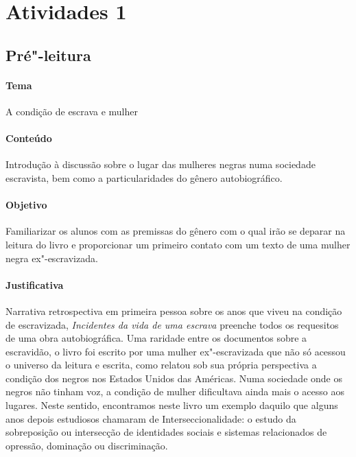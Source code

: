 \documentclass[11pt]{extarticle}
\begin{document}
\tableofcontents


\section{Atividades 1}


\subsection{Pré"-leitura}

\paragraph{Tema} A condição de escrava e mulher

\paragraph{Conteúdo} Introdução à discussão sobre o lugar das mulheres negras
numa sociedade escravista, bem como a particularidades do gênero autobiográfico.

\paragraph{Objetivo} Familiarizar os alunos com as premissas do gênero com o qual
irão se deparar na leitura do livro e proporcionar um primeiro contato com um texto
de uma mulher negra ex"-escravizada.

\paragraph{Justificativa} Narrativa retrospectiva em primeira pessoa sobre os anos 
que viveu na condição de escravizada, \emph{Incidentes da vida de uma escrava} 
preenche todos os requesitos de uma obra autobiográfica. Uma raridade entre os 
documentos sobre a escravidão, o livro foi escrito por uma mulher ex"-escravizada 
que não só acessou o universo da leitura e escrita, como relatou sob sua própria perspectiva 
a condição dos negros nos Estados Unidos das Américas. 
Numa sociedade onde os negros não tinham voz, a condição de mulher dificultava ainda mais
o acesso aos lugares. Neste sentido, encontramos neste livro um exemplo daquilo que alguns anos
depois estudiosos chamaram de Interseccionalidade: o estudo da sobreposição ou intersecção de 
identidades sociais e sistemas relacionados de opressão, dominação ou discriminação.
\end{document}
